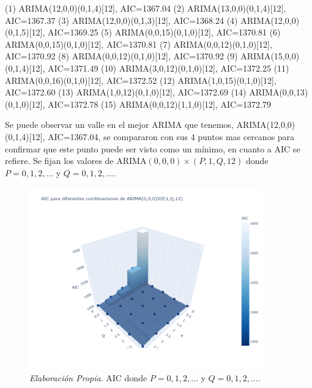 \documentclass[12pt,letterpaper]{article}   %
\begin{document}
\begin{smallconsole}[caption={donde $p = 0, 1, 2, \dots$ y $Q = 0, 1, 2, \dots$.}]
(1) ARIMA(12,0,0)(0,1,4)[12], AIC=1367.04
(2) ARIMA(13,0,0)(0,1,4)[12], AIC=1367.37
(3) ARIMA(12,0,0)(0,1,3)[12], AIC=1368.24
(4) ARIMA(12,0,0)(0,1,5)[12], AIC=1369.25
(5) ARIMA(0,0,15)(0,1,0)[12], AIC=1370.81
(6) ARIMA(0,0,15)(0,1,0)[12], AIC=1370.81
(7) ARIMA(0,0,12)(0,1,0)[12], AIC=1370.92
(8) ARIMA(0,0,12)(0,1,0)[12], AIC=1370.92
(9) ARIMA(15,0,0)(0,1,4)[12], AIC=1371.49
(10) ARIMA(3,0,12)(0,1,0)[12], AIC=1372.25
(11) ARIMA(0,0,16)(0,1,0)[12], AIC=1372.52
(12) ARIMA(1,0,15)(0,1,0)[12], AIC=1372.60
(13) ARIMA(1,0,12)(0,1,0)[12], AIC=1372.69
(14) ARIMA(0,0,13)(0,1,0)[12], AIC=1372.78
(15) ARIMA(0,0,12)(1,1,0)[12], AIC=1372.79
\end{smallconsole}
Se puede observar un valle en el mejor ARIMA que tenemos, ARIMA(12,0,0)(0,1,4)[12], AIC=1367.04, se compararon con sus 4 puntos mas cercanos para confirmar que este punto puede ser visto como un mínimo, en cuanto a AIC se refiere.
\newpage
Se fijan los valores de $\text{ARIMA}(0, 0, 0) \times (P, 1, Q, 12)$ donde $P = 0, 1, 2, \dots$ y $Q = 0, 1, 2, \dots$.
\begin{figure}[h!]
    \centering
    \includegraphics[width=0.9\textwidth]{imagenes/99-04.png}
    \caption{\textit{Elaboración Propia}. AIC donde $P = 0, 1, 2, \dots$ y $Q = 0, 1, 2, \dots$.}
    \label{fig:FAC_FACP_yeo}
\end{figure}
\end{document}
